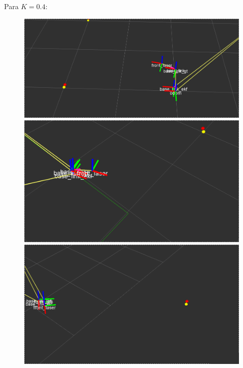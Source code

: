Para $K=0.4$:

\begin{figure}[!htb]
  \includegraphics[width=\linewidth]{imagenesEKF/k0.4/1.png}
\endminipage\hfill
{}
  \includegraphics[width=\linewidth]{imagenesEKF/k0.4/2.png}
\endminipage\hfill
{}%
  \includegraphics[width=\linewidth]{imagenesEKF/k0.4/3.png}
\endminipage
\end{figure}
\FloatBarrier

